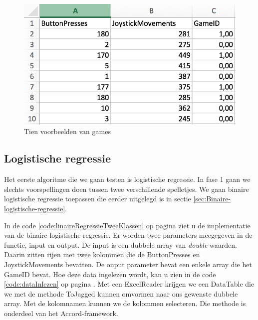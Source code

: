 \begin{figure}[]
	\centering
	\includegraphics{img/Dataset}
	\caption{Tien voorbeelden van games}
	\label{fig:regressieFig}
\end{figure}


\newpage

\subsection{Logistische regressie}
\label{sec:Logistischeregressie-fase1}

Het eerste algoritme die we gaan testen is logistische regressie. In fase 1 gaan we slechts voorspellingen doen tussen twee verschillende spelletjes. We gaan binaire logistische regressie toepassen die eerder uitgelegd is in sectie \ref{sec:Binaire-logistische-regressie}.

In de code \ref{code:linaireRegressieTweeKlassen} op pagina \pageref{code:linaireRegressieTweeKlassen} ziet u de implementatie van de binaire logistische regressie. Er worden twee parameters meegegeven in de functie, input en output. De input is een dubbele array van \textit{double} waarden. Daarin zitten rijen met twee kolommen die de ButtonPresses en JoystickMovements bevatten. De ouput parameter bevat een enkele array die het GameID bevat. Hoe deze data ingelezen wordt, kan u zien in de code \ref{code:dataInlezen} op pagina \pageref{code:dataInlezen}. Met een ExcelReader krijgen we een DataTable die we met de methode ToJagged kunnen omvormen naar ons gewenste dubbele array. Met de kolomnamen kunnen we de kolommen selecteren. Die methode is onderdeel van het Accord-framework. 



